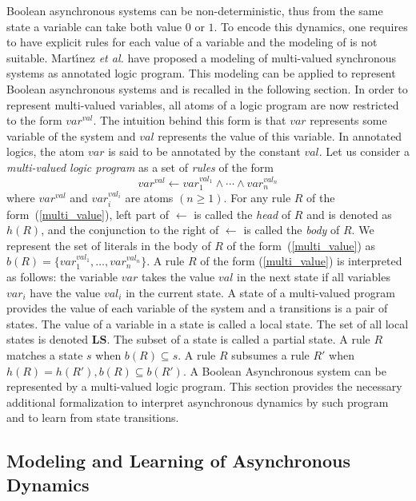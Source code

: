 	Boolean asynchronous systems can be non-deterministic, thus from the same state a variable can take both value $0$ or $1$.
	To encode this dynamics, one requires to have explicit rules for each value of a variable and the modeling of \cite{ribeiro2015learning} is not suitable.
	Mart{\'\i}nez \textit{et al.} \cite{DMTRICLP15} have proposed a modeling of multi-valued synchronous systems as annotated logic program.
    This modeling can be applied to represent Boolean asynchronous systems and is recalled in the following section.
	In order to represent multi-valued variables, all atoms of a logic program are now restricted to the form $var^{val}$.
	The intuition behind this form is that $var$ represents some variable of the system and $val$ represents the value of this variable.
	In annotated logics, the atom $var$ is said to be annotated by the constant $val$.
	Let us consider a {\it multi-valued logic program\/} as a set of {\it rules\/} of the form  
	\begin{equation}\label{multi_value}
		var^{val} \leftarrow var_1^{val_1} \wedge \cdots \wedge var_n^{val_n}
	\end{equation}
	where $var^{val}$ and $var_i^{val_i}$ are atoms $(n \geq 1)$.
	For any rule $R$ of the form~(\ref{multi_value}), left part of $\leftarrow$ is called the {\it head\/} of $R$ and is denoted as $h(R)$,
	and the conjunction to the right of $\leftarrow$ is called the {\it body\/} of $R$.  
	We represent the set of literals in the body of $R$ of the form~(\ref{multi_value}) as $b(R)=\{var_1^{val_1},\ldots,var_n^{val_n}\}$. 
	A rule $R$ of the form (\ref{multi_value}) is interpreted as follows:
	the variable $var$ takes the value $val$ in the next state if all variables $var_i$ have the value $val_i$ in the current state.
	A state of a multi-valued program provides the value of each variable of the system and a transitions is a pair of states.
	The value of a variable in a state is called a local state.
	The set of all local states is denoted $\mathbf{LS}$.
	The subset of a state is called a partial state.
	A rule $R$ matches a state $s$ when $b(R) \subseteq s$.
	A rule $R$ subsumes a rule $R'$ when $h(R)=h(R'), b(R) \subseteq b(R')$.
%
A Boolean Asynchronous system can be represented by a multi-valued logic program.
This section provides the necessary additional formalization to interpret asynchronous dynamics by such program and to learn from state transitions.

\subsection{Modeling and Learning of Asynchronous Dynamics}\label{sec:alfit}

